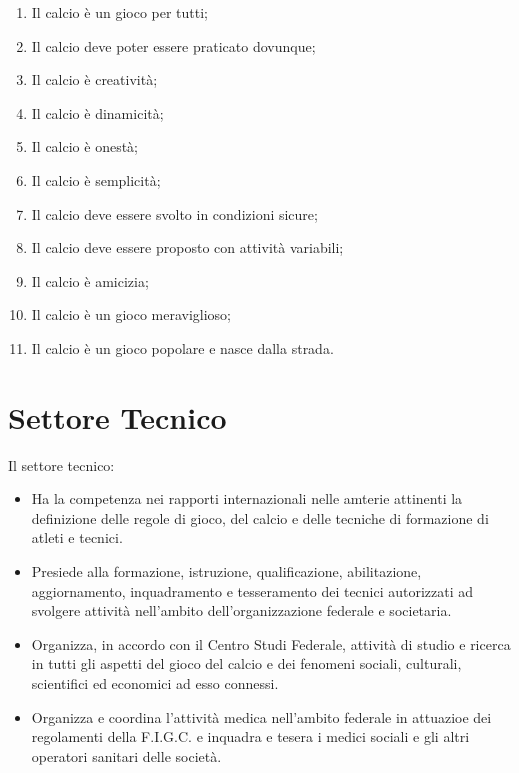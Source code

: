 \documentclass[../uefaC.tex]{subfiles}
\begin{document}
\begin{enumerate}
    \item Il calcio è un gioco per tutti;
    \item Il calcio deve poter essere praticato dovunque;
    \item Il calcio è creatività;
    \item Il calcio è dinamicità;
    \item Il calcio è onestà;
    \item Il calcio è semplicità;
    \item Il calcio deve essere svolto in condizioni sicure;
    \item Il calcio deve essere proposto con attività variabili;
    \item Il calcio è amicizia;
    \item Il calcio è un gioco meraviglioso;
    \item Il calcio è un gioco popolare e nasce dalla strada.
\end{enumerate}

\section{Settore Tecnico}
Il settore tecnico:
\begin{itemize}
    \item Ha la competenza nei rapporti internazionali nelle amterie attinenti la definizione delle regole di gioco, del calcio e delle tecniche di formazione di atleti e tecnici.
    \item Presiede alla formazione, istruzione, qualificazione, abilitazione, aggiornamento, inquadramento e tesseramento dei tecnici autorizzati ad svolgere attività nell'ambito dell'organizzazione federale e societaria.
    \item Organizza, in accordo con il Centro Studi Federale, attività di studio e ricerca in tutti gli aspetti del gioco del calcio e dei fenomeni sociali, culturali, scientifici ed economici ad esso connessi.
    \item Organizza e coordina l'attività medica nell'ambito federale in attuazioe dei regolamenti della F.I.G.C. e inquadra e tesera i medici sociali e gli altri operatori sanitari delle società.
\end{itemize}
\end{document}
